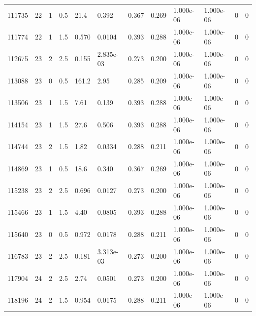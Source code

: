 \documentclass[preview]{standalone}
\begin{document}
{{{{{\begin{tabular}{L{1.2cm}C{1.2cm} C{0.3cm}C{0.5cm} C{1.4cm}C{1.4cm} C{1.4cm}C{1.4cm} C{1.6cm}C{1.6cm} C{1.6cm}C{1.6cm}}
  111735  &    22  & 1     & 0.5 &  21.4  & 0.392  &  0.367&   0.269& 1.000e-06 & 1.000e-06   &  0 & 0  \\ 
  111774  &    22  & 1     & 1.5 &  0.570  & 0.0104  &  0.393&   0.288& 1.000e-06 & 1.000e-06   &  0 & 0  \\ 
  112675  &    23  & 2     & 2.5 &  0.155  & 2.835e-03  &  0.273&   0.200& 1.000e-06 & 1.000e-06   &  0 & 0  \\ 
  113088  &    23  & 0     & 0.5 &  161.2  & 2.95  &  0.285&   0.209& 1.000e-06 & 1.000e-06   &  0 & 0  \\ 
  113506  &    23  & 1     & 1.5 &  7.61  & 0.139  &  0.393&   0.288& 1.000e-06 & 1.000e-06   &  0 & 0  \\ 
  114154  &    23  & 1     & 1.5 &  27.6  & 0.506  &  0.393&   0.288& 1.000e-06 & 1.000e-06   &  0 & 0  \\ 
  114744  &    23  & 2     & 1.5 &  1.82  & 0.0334  &  0.288&   0.211& 1.000e-06 & 1.000e-06   &  0 & 0  \\ 
  114869  &    23  & 1     & 0.5 &  18.6  & 0.340  &  0.367&   0.269& 1.000e-06 & 1.000e-06   &  0 & 0  \\ 
  115238  &    23  & 2     & 2.5 &  0.696  & 0.0127  &  0.273&   0.200& 1.000e-06 & 1.000e-06   &  0 & 0  \\ 
  115466  &    23  & 1     & 1.5 &  4.40  & 0.0805  &  0.393&   0.288& 1.000e-06 & 1.000e-06   &  0 & 0  \\ 
  115640  &    23  & 0     & 0.5 &  0.972  & 0.0178  &  0.288&   0.211& 1.000e-06 & 1.000e-06   &  0 & 0  \\ 
  116783  &    23  & 2     & 2.5 &  0.181  & 3.313e-03  &  0.273&   0.200& 1.000e-06 & 1.000e-06   &  0 & 0  \\ 
  117904  &    24  & 2     & 2.5 &  2.74  & 0.0501  &  0.273&   0.200& 1.000e-06 & 1.000e-06   &  0 & 0  \\ 
  118196  &    24  & 2     & 1.5 &  0.954  & 0.0175  &  0.288&   0.211& 1.000e-06 & 1.000e-06   &  0 & 0  \\ 
\hline 
\end{tabular} 

}}}}}
\end{document}
